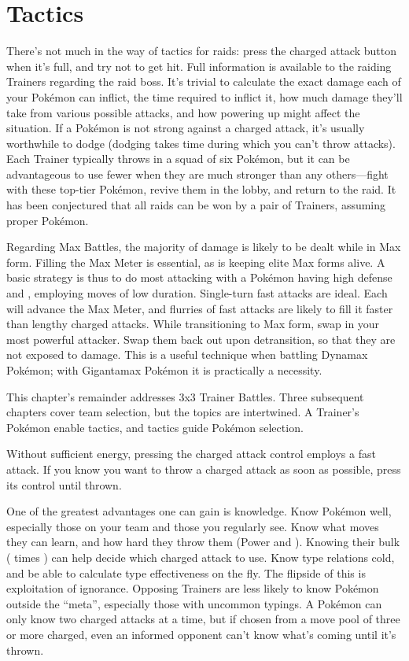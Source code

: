 \chapter{Tactics\label{chap:strategy}}
There's not much in the way of tactics for raids: press the charged attack
 button when it's full, and try not to get hit.
Full information is available to the raiding Trainers regarding the raid boss.
It's trivial to calculate the exact damage each of your Pokémon can inflict,
 the time required to inflict it, how much damage they'll take from various
 possible attacks, and how powering up might affect the situation.
If a Pokémon is not strong against a charged attack, it's usually worthwhile to dodge
 (dodging takes time during which you can't throw attacks).
Each Trainer typically throws in a squad of six Pokémon, but it can be advantageous to use fewer when
 they are much stronger than any others---fight with these top-tier
 Pokémon, revive them in the lobby, and return to the raid.
It has been conjectured that all raids can be won by a pair of Trainers, assuming
 proper Pokémon.

Regarding Max Battles, the majority of damage is likely to be dealt while in Max form.
Filling the Max Meter is essential, as is keeping elite Max forms alive.
A basic strategy is thus to do most attacking with a Pokémon having
  high defense and \MHP, employing moves of low duration.
Single-turn fast attacks are ideal.
Each will advance the Max Meter, and flurries of fast attacks are likely to
 fill it faster than lengthy charged attacks.
While transitioning to Max form, swap in your most powerful attacker.
Swap them back out upon detransition, so that they are not exposed to damage.
This is a useful technique when battling Dynamax Pokémon; with Gigantamax Pokémon it is practically a necessity.

This chapter's remainder addresses 3x3 Trainer Battles.
Three subsequent chapters cover team selection, but the topics are intertwined.
A Trainer's Pokémon enable tactics, and tactics guide Pokémon selection.
\begin{tipbox}[title=A tip regarding battle UI]
Without sufficient energy, pressing the charged attack control employs a fast attack.
If you know you want to throw a charged attack as soon as possible, press its control until thrown.
\end{tipbox}
One of the greatest advantages one can gain is knowledge.
Know Pokémon well, especially those on your team and those you regularly see.
Know what moves they can learn, and how hard they throw them (Power and ).
Knowing their bulk ( times \MHP) can help decide which charged attack to use.
Know type relations cold, and be able to calculate type effectiveness on the fly.
The flipside of this is exploitation of ignorance.
Opposing Trainers are less likely to know Pokémon outside the ``meta'',
 especially those with uncommon typings.
A Pokémon can only know two charged attacks at a time, but if
 chosen from a move pool of three or more charged, even an informed opponent
 can't know what's coming until it's thrown.

